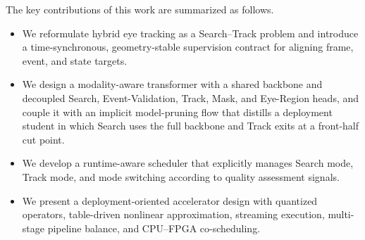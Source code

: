 \documentclass[journal]{IEEEtran}
\begin{document}
The key contributions of this work are summarized as follows.
\begin{itemize}
    \item We reformulate hybrid eye tracking as a Search--Track problem and introduce a time-synchronous, geometry-stable supervision contract for aligning frame, event, and state targets.
    \item We design a modality-aware transformer with a shared backbone and decoupled Search, Event-Validation, Track, Mask, and Eye-Region heads, and couple it with an implicit model-pruning flow that distills a deployment student in which Search uses the full backbone and Track exits at a front-half cut point.
    \item We develop a runtime-aware scheduler that explicitly manages Search mode, Track mode, and mode switching according to quality assessment signals.
    \item We present a deployment-oriented accelerator design with quantized operators, table-driven nonlinear approximation, streaming execution, multi-stage pipeline balance, and CPU--FPGA co-scheduling.
\end{itemize}
\end{document}
